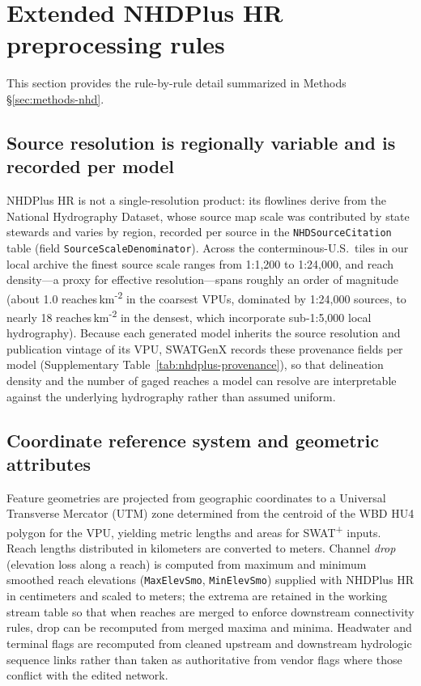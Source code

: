 \section{Extended NHDPlus HR preprocessing rules}
\label{sec:supp-nhd-extended}

This section provides the rule-by-rule detail summarized in Methods \S\ref{sec:methods-nhd}.

\subsection{Source resolution is regionally variable and is recorded per model}
NHDPlus HR is not a single-resolution product: its flowlines derive from the National Hydrography Dataset, whose source map scale was contributed by state stewards and varies by region, recorded per source in the \texttt{NHDSourceCitation} table (field \texttt{SourceScaleDenominator}).
Across the conterminous-U.S.\ tiles in our local archive the finest source scale ranges from 1:1,200 to 1:24,000, and reach density---a proxy for effective resolution---spans roughly an order of magnitude (about 1.0 reaches\,km\textsuperscript{-2} in the coarsest VPUs, dominated by 1:24,000 sources, to nearly 18 reaches\,km\textsuperscript{-2} in the densest, which incorporate sub-1:5,000 local hydrography).
Because each generated model inherits the source resolution and publication vintage of its VPU, SWATGenX records these provenance fields per model (Supplementary Table~\ref{tab:nhdplus-provenance}), so that delineation density and the number of gaged reaches a model can resolve are interpretable against the underlying hydrography rather than assumed uniform.

\subsection{Coordinate reference system and geometric attributes}
Feature geometries are projected from geographic coordinates to a Universal Transverse Mercator (UTM) zone determined from the centroid of the WBD HU4 polygon for the VPU, yielding metric lengths and areas for SWAT\textsuperscript{+} inputs.
Reach lengths distributed in kilometers are converted to meters.
Channel \emph{drop} (elevation loss along a reach) is computed from maximum and minimum smoothed reach elevations (\texttt{MaxElevSmo}, \texttt{MinElevSmo}) supplied with NHDPlus HR in centimeters and scaled to meters; the extrema are retained in the working stream table so that when reaches are merged to enforce downstream connectivity rules, drop can be recomputed from merged maxima and minima.
Headwater and terminal flags are recomputed from cleaned upstream and downstream hydrologic sequence links rather than taken as authoritative from vendor flags where those conflict with the edited network.

